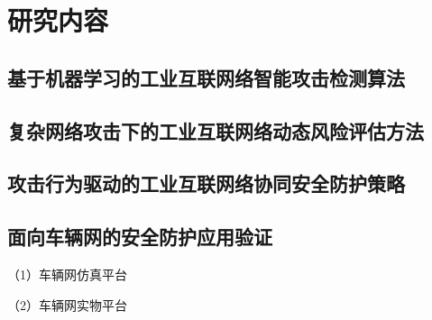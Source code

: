 \section{研究内容}

\subsection{基于机器学习的工业互联网络智能攻击检测算法}

\subsection{复杂网络攻击下的工业互联网络动态风险评估方法}

\subsection{攻击行为驱动的工业互联网络协同安全防护策略}

\subsection{面向车辆网的安全防护应用验证}

（1）车辆网仿真平台

（2）车辆网实物平台
